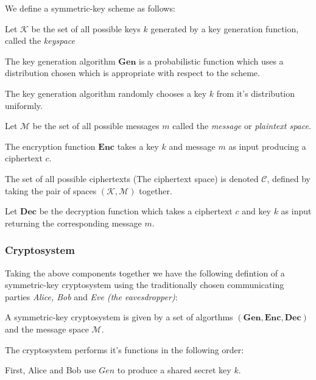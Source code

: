 We define a symmetric-key scheme as follows:


Let $\mathbf{\mathcal{K}}$ be the set of all possible keys $k$  generated by a key generation function, called the \textit{keyspace}

The key generation algorithm $\mathbf{Gen}$ is a probabilistic function which uses a distribution chosen which is appropriate with respect to the scheme.

The key generation algorithm randomly chooses a key $k$ from it's distribution uniformly.


Let $\mathbf{\mathcal{M}}$ be the set of all possible messages $m$ called the \textit{message} or \textit{{plaintext space}}.


The encryption function $\mathbf{{Enc}}$ takes a key $k$ and message $m$ as input producing a ciphertext $c$.


The set of all possible ciphertexts (The ciphertext space) is denoted $\mathbf{\mathcal{C}}$, defined by taking the pair of spaces $\mathbf{(\mathcal{K}, \mathcal{M})}$ together.


Let $\mathbf{Dec}$ be the decryption function which takes a ciphertext $c$ and key $k$ as input returning the corresponding message $m$.


\subsubsection*{Cryptosystem}


Taking the above components together we have the following defintion of a symmetric-key cryptosystem using the traditionally chosen communicating parties \emph{Alice, Bob} and \emph{Eve (the eavesdropper)}:


A symmetric-key cryptosystem is given by a set of algorthms $\mathbf{(Gen, Enc, Dec)}$ and the message space $\mathcal{M}$.

The cryptosystem performs it's functions in the following order:

First, Alice and Bob use $Gen$ to produce a shared secret key $k$.

